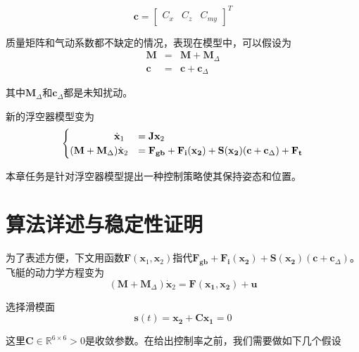 \begin{equation}\label{eq:cvector}
    \mathbf{c} = \left[\begin{matrix}
    C_x&C_z&C_{my}
    \end{matrix}\right]^T
\end{equation}

质量矩阵和气动系数都不缺定的情况，表现在模型中，可以假设为
\begin{eqnarray}
    \mathbf{M}&=&\mathbf{M}+\mathbf{M}_{\Delta} \label{eq:Muncertainty} \\
    \mathbf{c}&=&\mathbf{c}+\mathbf{c}_{\Delta} \label{eq:cuncertainty}
\end{eqnarray}

其中$\mathbf{M}_{\Delta}$和$\mathbf{c}_{\Delta}$都是未知扰动。

新的浮空器模型变为
\begin{equation}\label{eq:modelwc}
    \begin{cases}
    \hspace{4.5em}\dot{\mathbf{x}}_1 &= \mathbf{J}\mathbf{x}_2\\
    (\mathbf{M}+\mathbf{M}_{\Delta})\dot{\mathbf{x}}_2&=\mathbf{F_{gb}+F_{i}(x_2)}+\mathbf{S(x_2)} (\mathbf{c}+\mathbf{c}_{\Delta})+\mathbf{F_t}
    \end{cases}
\end{equation}

本章任务是针对浮空器模型提出一种控制策略使其保持姿态和位置。

\section{算法详述与稳定性证明}\label{sec:3algo}
为了表述方便，下文用函数$\mathbf{F}(\mathbf{x}_1,\mathbf{x}_2)$指代$\mathbf{F_{gb}+F_{i}(x_2)}+\mathbf{S(x_2)} (\mathbf{c}+\mathbf{c}_{\Delta})$。飞艇的动力学方程变为
\begin{equation}\label{eq:dynamicwc}
    (\mathbf{M}+\mathbf{M}_{\Delta})\dot{\mathbf{x}}_2=\mathbf{F(x_1,x_2)+u}
\end{equation}

选择滑模面
\begin{equation}
    \mathbf{s}(t)=\mathbf{x_2+Cx_1}=0
\end{equation}

这里$\mathbf{C}\in\mathbb{R}^{6\times 6}>0$是收敛参数。在给出控制率之前，我们需要做如下几个假设

